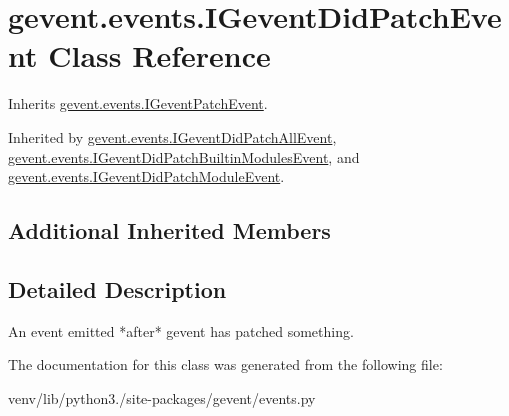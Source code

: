 \hypertarget{classgevent_1_1events_1_1_i_gevent_did_patch_event}{}\section{gevent.\+events.\+I\+Gevent\+Did\+Patch\+Event Class Reference}
\label{classgevent_1_1events_1_1_i_gevent_did_patch_event}


Inherits \hyperlink{classgevent_1_1events_1_1_i_gevent_patch_event}{gevent.\+events.\+I\+Gevent\+Patch\+Event}.



Inherited by \hyperlink{classgevent_1_1events_1_1_i_gevent_did_patch_all_event}{gevent.\+events.\+I\+Gevent\+Did\+Patch\+All\+Event}, \hyperlink{classgevent_1_1events_1_1_i_gevent_did_patch_builtin_modules_event}{gevent.\+events.\+I\+Gevent\+Did\+Patch\+Builtin\+Modules\+Event}, and \hyperlink{classgevent_1_1events_1_1_i_gevent_did_patch_module_event}{gevent.\+events.\+I\+Gevent\+Did\+Patch\+Module\+Event}.

\subsection*{Additional Inherited Members}


\subsection{Detailed Description}
\begin{DoxyVerb}An event emitted *after* gevent has patched something.
\end{DoxyVerb}
 

The documentation for this class was generated from the following file\+:\begin{DoxyCompactItemize}
\item 
venv/lib/python3./site-\/packages/gevent/events.\+py\end{DoxyCompactItemize}
